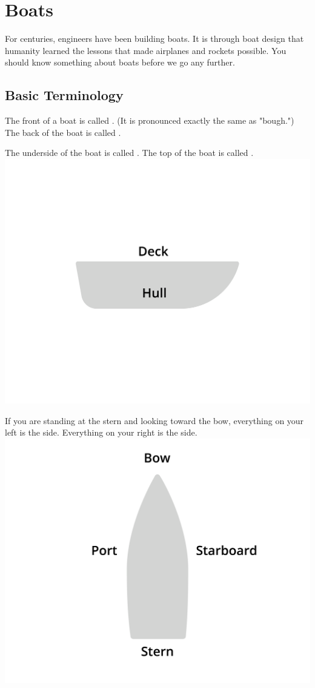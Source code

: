 \chapter{Boats}

For centuries,  engineers have been building boats.  It is through boat design that humanity learned the lessons that made airplanes and rockets possible.  
You should know something about boats before we go any further.

\section{Basic Terminology}

The front of a boat is called . (It is pronounced exactly the same as "bough.")   The back of the boat is called .

The underside of the boat is called .  The top of the boat is called .
\includegraphics[width=.75\textwidth]{deckHull.png}


If you are standing at the stern and looking toward the bow,  everything on your left is the  side.  Everything on your right is the  side.
\includegraphics[width=.75\textwidth]{bowStern.png}

